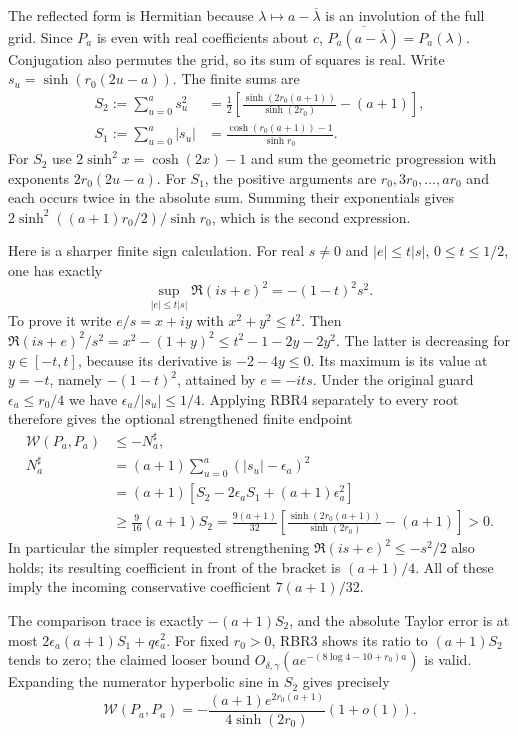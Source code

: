The reflected form is Hermitian because
$\lambda\mapsto a-\overline\lambda$ is an involution of the full
grid.  Since $P_a$ is even with real coefficients about $c$,
$\overline{P_a(a-\overline\lambda)}=P_a(\lambda)$.
Conjugation also permutes the grid, so its sum of squares is real.
Write $s_u=\sinh(r_0(2u-a))$.  The finite sums are
\[
\begin{split}
 S_2:=\sum_{u=0}^a s_u^2
 &=\frac12\left[
 \frac{\sinh(2r_0(a+1))}{\sinh(2r_0)}-(a+1)\right],\\
 S_1:=\sum_{u=0}^a|s_u|
 &=\frac{\cosh(r_0(a+1))-1}{\sinh r_0}.
\end{split}                                                    \tag{RBR3}
\]
For $S_2$ use $2\sinh^2x=\cosh(2x)-1$ and sum the geometric
progression with exponents $2r_0(2u-a)$.
For $S_1$, the positive arguments are
$r_0,3r_0,\ldots,ar_0$ and each occurs twice in the absolute sum.
Summing their exponentials gives
$2\sinh^2((a+1)r_0/2)/\sinh r_0$, which is the second expression.

Here is a sharper finite sign calculation.  For real $s\ne0$ and
$|e|\le t|s|$, $0\le t\le1/2$, one has exactly
\[
 \sup_{|e|\le t|s|}\Re(is+e)^2=-(1-t)^2s^2 .
 \tag{RBR4}
\]
To prove it write $e/s=x+iy$ with $x^2+y^2\le t^2$.
Then
$\Re(is+e)^2/s^2=x^2-(1+y)^2
\le t^2-1-2y-2y^2$.
The latter is decreasing for $y\in[-t,t]$, because its derivative
is $-2-4y\le0$.  Its maximum is its value at $y=-t$,
namely $-(1-t)^2$, attained by $e=-its$.
Under the original guard $\epsilon_a\le r_0/4$ we have
$\epsilon_a/|s_u|\le1/4$.  Applying RBR4 separately to every root
therefore gives the optional strengthened finite endpoint
\[
\begin{split}
 \mathcal W(P_a,P_a)&\le-N_a^\sharp,\\
 N_a^\sharp
 &=(a+1)\sum_{u=0}^a(|s_u|-\epsilon_a)^2\\
 &=(a+1)[S_2-2\epsilon_a S_1+(a+1)\epsilon_a^2]\\
 &\ge\frac9{16}(a+1)S_2
 =\frac{9(a+1)}{32}
 \left[\frac{\sinh(2r_0(a+1))}{\sinh(2r_0)}-(a+1)\right]>0 .
\end{split}                                                    \tag{RBR5}
\]
In particular the simpler requested strengthening
$\Re(is+e)^2\le-s^2/2$ also holds; its resulting coefficient in
front of the bracket is $(a+1)/4$.  All of these imply the
incoming conservative coefficient $7(a+1)/32$.

The comparison trace is exactly $-(a+1)S_2$, and the absolute
Taylor error is at most
$2\epsilon_a(a+1)S_1+q\epsilon_a^2$.
For fixed $r_0>0$, RBR3 shows its ratio to $(a+1)S_2$ tends to zero;
the claimed looser bound
$O_{\delta,\gamma}(a e^{-(8\log4-10+r_0)a})$ is valid.
Expanding the numerator hyperbolic sine in $S_2$ gives precisely
\[
 \mathcal W(P_a,P_a)
 =-\frac{(a+1)e^{2r_0(a+1)}}{4\sinh(2r_0)}(1+o(1)).
 \tag{RBR6}
\]

